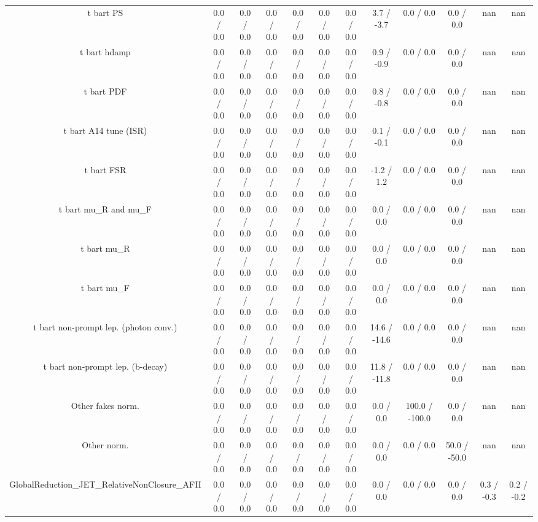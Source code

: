 \begin{table}[htbp]
\begin{center}
\begin{tabular}{|c|c|c|c|c|c|c|c|c|c|c|c|}
  t bar{t} PS & 0.0 / 0.0 & 0.0 / 0.0 & 0.0 / 0.0 & 0.0 / 0.0 & 0.0 / 0.0 & 0.0 / 0.0 & 3.7 / -3.7 & 0.0 / 0.0 & 0.0 / 0.0 &    nan    &    nan    \\ 
  t bar{t} hdamp & 0.0 / 0.0 & 0.0 / 0.0 & 0.0 / 0.0 & 0.0 / 0.0 & 0.0 / 0.0 & 0.0 / 0.0 & 0.9 / -0.9 & 0.0 / 0.0 & 0.0 / 0.0 &    nan    &    nan    \\ 
  t bar{t} PDF & 0.0 / 0.0 & 0.0 / 0.0 & 0.0 / 0.0 & 0.0 / 0.0 & 0.0 / 0.0 & 0.0 / 0.0 & 0.8 / -0.8 & 0.0 / 0.0 & 0.0 / 0.0 &    nan    &    nan    \\ 
  t bar{t} A14 tune (ISR) & 0.0 / 0.0 & 0.0 / 0.0 & 0.0 / 0.0 & 0.0 / 0.0 & 0.0 / 0.0 & 0.0 / 0.0 & 0.1 / -0.1 & 0.0 / 0.0 & 0.0 / 0.0 &    nan    &    nan    \\ 
  t bar{t} FSR & 0.0 / 0.0 & 0.0 / 0.0 & 0.0 / 0.0 & 0.0 / 0.0 & 0.0 / 0.0 & 0.0 / 0.0 & -1.2 / 1.2 & 0.0 / 0.0 & 0.0 / 0.0 &    nan    &    nan    \\ 
  t bar{t}  mu_{R} and  mu_{F} & 0.0 / 0.0 & 0.0 / 0.0 & 0.0 / 0.0 & 0.0 / 0.0 & 0.0 / 0.0 & 0.0 / 0.0 & 0.0 / 0.0 & 0.0 / 0.0 & 0.0 / 0.0 &    nan    &    nan    \\ 
  t bar{t}  mu_{R} & 0.0 / 0.0 & 0.0 / 0.0 & 0.0 / 0.0 & 0.0 / 0.0 & 0.0 / 0.0 & 0.0 / 0.0 & 0.0 / 0.0 & 0.0 / 0.0 & 0.0 / 0.0 &    nan    &    nan    \\ 
  t bar{t}  mu_{F} & 0.0 / 0.0 & 0.0 / 0.0 & 0.0 / 0.0 & 0.0 / 0.0 & 0.0 / 0.0 & 0.0 / 0.0 & 0.0 / 0.0 & 0.0 / 0.0 & 0.0 / 0.0 &    nan    &    nan    \\ 
  t bar{t} non-prompt lep. (photon conv.) & 0.0 / 0.0 & 0.0 / 0.0 & 0.0 / 0.0 & 0.0 / 0.0 & 0.0 / 0.0 & 0.0 / 0.0 & 14.6 / -14.6 & 0.0 / 0.0 & 0.0 / 0.0 &    nan    &    nan    \\ 
  t bar{t} non-prompt lep. (b-decay) & 0.0 / 0.0 & 0.0 / 0.0 & 0.0 / 0.0 & 0.0 / 0.0 & 0.0 / 0.0 & 0.0 / 0.0 & 11.8 / -11.8 & 0.0 / 0.0 & 0.0 / 0.0 &    nan    &    nan    \\ 
  Other fakes norm. & 0.0 / 0.0 & 0.0 / 0.0 & 0.0 / 0.0 & 0.0 / 0.0 & 0.0 / 0.0 & 0.0 / 0.0 & 0.0 / 0.0 & 100.0 / -100.0 & 0.0 / 0.0 &    nan    &    nan    \\ 
  Other norm. & 0.0 / 0.0 & 0.0 / 0.0 & 0.0 / 0.0 & 0.0 / 0.0 & 0.0 / 0.0 & 0.0 / 0.0 & 0.0 / 0.0 & 0.0 / 0.0 & 50.0 / -50.0 &    nan    &    nan    \\ 
  GlobalReduction_JET_RelativeNonClosure_AFII & 0.0 / 0.0 & 0.0 / 0.0 & 0.0 / 0.0 & 0.0 / 0.0 & 0.0 / 0.0 & 0.0 / 0.0 & 0.0 / 0.0 & 0.0 / 0.0 & 0.0 / 0.0 & 0.3 / -0.3 & 0.2 / -0.2 \\ 

\end{tabular}
\end{center}
\end{table}
